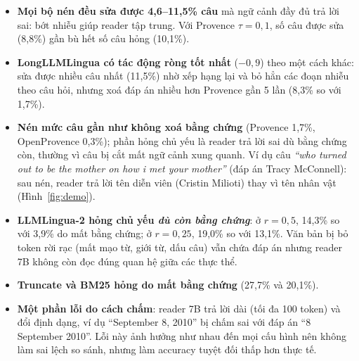 \begin{itemize}
  \item \textbf{Mọi bộ nén đều sửa được 4,6--11,5\% câu} mà ngữ cảnh đầy đủ trả lời sai: bớt nhiễu giúp reader
  tập trung. Với Provence $\tau=0{,}1$, số câu được sửa (8,8\%) gần bù hết số câu hỏng (10,1\%).
  \item \textbf{LongLLMLingua có tác động ròng tốt nhất} ($-0{,}9$) theo một cách khác: sửa được nhiều
  câu nhất (11,5\%) nhờ xếp hạng lại và bỏ hẳn các đoạn nhiễu theo câu hỏi, nhưng xoá đáp án nhiều hơn
  Provence gần 5 lần (8,3\% so với 1,7\%).
  \item \textbf{Nén mức câu gần như không xoá bằng chứng} (Provence 1,7\%, OpenProvence 0,3\%); phần
  hỏng chủ yếu là reader trả lời sai dù bằng chứng còn, thường vì câu bị cắt mất ngữ cảnh xung quanh.
  Ví dụ câu \emph{``who turned out to be the mother on how i met your mother''} (đáp án Tracy McConnell):
  sau nén, reader trả lời tên diễn viên (Cristin Milioti) thay vì tên nhân vật (Hình~\ref{fig:demo}).
  \item \textbf{LLMLingua-2 hỏng chủ yếu \emph{dù còn bằng chứng}}: ở $r=0{,}5$, 14,3\% so với 3,9\% do
  mất bằng chứng; ở $r=0{,}25$, 19,0\% so với 13,1\%. Văn bản bị bỏ token rời rạc (mất mạo từ, giới từ,
  dấu câu) vẫn chứa đáp án nhưng reader 7B không còn đọc đúng quan hệ giữa các thực thể.
  \item \textbf{Truncate và BM25 hỏng do mất bằng chứng} (27,7\% và 20,1\%).
  \item \textbf{Một phần lỗi do cách chấm}: reader 7B trả lời dài (tối đa 100 token) và đổi định dạng,
  ví dụ ``September 8, 2010'' bị chấm sai với đáp án ``8 September 2010''. Lỗi này ảnh hưởng như nhau
  đến mọi cấu hình nên không làm sai lệch so sánh, nhưng làm accuracy tuyệt đối thấp hơn thực tế.
\end{itemize}
